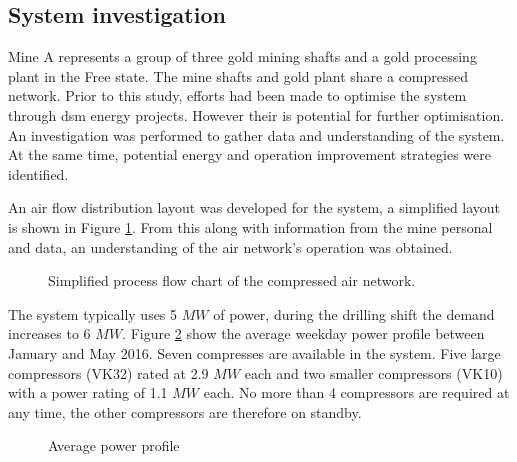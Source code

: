 \subsection{System investigation}
Mine A represents a group of three gold mining shafts and a gold processing plant in the Free state. The mine shafts and gold plant share a compressed network. Prior to this study, efforts had been made to optimise the system through \gls{dsm} energy projects. However their is potential for further optimisation. An investigation was performed to gather data and understanding of the system. At the same time, potential energy and operation improvement strategies were identified.
\par 
An air flow distribution layout was developed for the system, a simplified layout is shown in Figure \ref{fig: Beatrix Air layout}. From this along with information from the mine personal and data, an understanding of the air network's operation was obtained. 
\par 
\begin{figure}[h!]
	\centering
	\caption{Simplified process flow chart of the compressed air network.}
	\label{fig: Beatrix Air layout}
\end{figure}

The system typically uses 5 $MW$ of power,  during the drilling shift the demand increases to 6 $MW$. Figure \ref{fig: Beatrix power baseline} show the average weekday power profile between January and May 2016. Seven compresses are available in the system. Five large compressors (VK32) rated at 2.9 $MW$ each and two smaller compressors (VK10) with a power rating of 1.1 $MW$ each. No more than 4 compressors are required at any time, the other compressors are therefore on standby.
\begin{figure}[h!]
	\centering
	
	\caption{Average power profile}
	\label{fig: Beatrix power baseline}
\end{figure}

